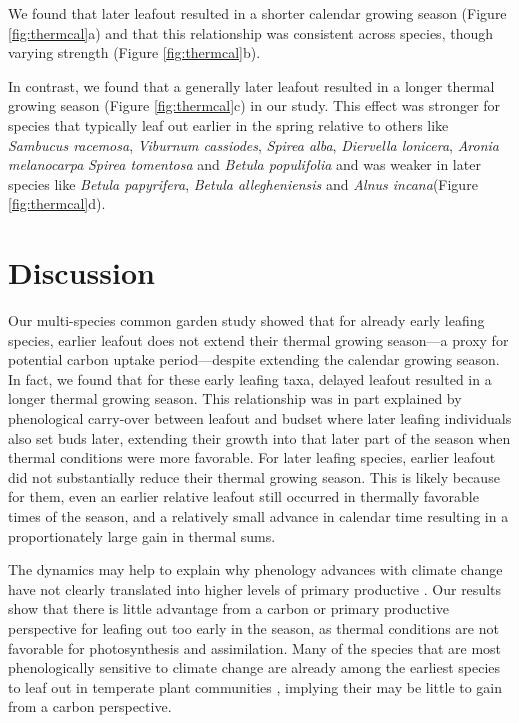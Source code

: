 \documentclass[12 pt]{article}
\begin{document}
We found that later leafout resulted in a shorter calendar growing season (Figure \ref{fig:thermcal}a) and that this relationship was consistent across species, though varying strength  (Figure \ref{fig:thermcal}b).

In contrast, we found that a generally later leafout resulted in a longer thermal growing season (Figure \ref{fig:thermcal}c) in our study. This effect was stronger for species that typically leaf out earlier in the spring relative to others like \emph{Sambucus racemosa}, \emph{Viburnum cassiodes}, \emph{Spirea alba}, \emph{Diervella lonicera}, \emph{Aronia melanocarpa} \emph{Spirea tomentosa} and \emph{Betula populifolia} and was weaker in later species like \emph{Betula papyrifera}, \emph{Betula allegheniensis} and \emph{Alnus incana}(Figure \ref{fig:thermcal}d).


\section{Discussion}
Our multi-species common garden study showed that for already early leafing species, earlier leafout does not extend their thermal growing season---a proxy for potential carbon uptake period---despite extending the calendar growing season. In fact, we found that for these early leafing taxa, delayed leafout resulted in a longer thermal growing season. This relationship was in part explained by phenological carry-over between leafout and budset where later leafing individuals also set buds later, extending their growth into that later part of the season when thermal conditions were more favorable.  For later leafing species, earlier leafout did not substantially reduce their thermal growing season. This is likely because for them, even an earlier relative leafout still occurred in thermally favorable times of the season, and a relatively small advance in calendar time resulting in a proportionately large gain in thermal sums.

The dynamics may help to explain why phenology advances with climate change have not clearly translated into higher levels of primary productive \citep{}. Our results show that there is little advantage from a carbon or primary productive perspective for leafing out too early in the season, as thermal conditions are not favorable for photosynthesis and assimilation. Many of the species that are most phenologically sensitive to climate change are already among the earliest species to leaf out in temperate plant communities \citep{}, implying their may be little to gain from a carbon perspective.
\end{document}
